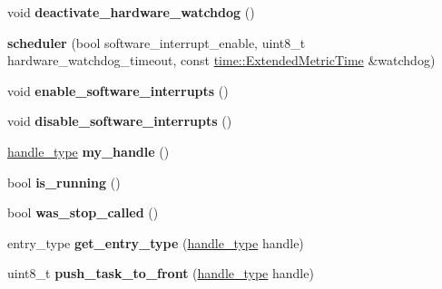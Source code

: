 \begin{DoxyCompactItemize}
void {\bfseries deactivate\+\_\+hardware\+\_\+watchdog} ()
\item 
\mbox{\label{classfsl_1_1os_1_1scheduler_a230f744ddd2b6b01986118750e7acb73}} 
{\bfseries scheduler} (bool software\+\_\+interrupt\+\_\+enable, uint8\+\_\+t hardware\+\_\+watchdog\+\_\+timeout, const \mbox{\hyperlink{classtime_1_1_extended_metric_time}{time\+::\+Extended\+Metric\+Time}} \&watchdog)
\item 
\mbox{\label{classfsl_1_1os_1_1scheduler_ac44463fc1db8cfb16afc064d6041afad}} 
void {\bfseries enable\+\_\+software\+\_\+interrupts} ()
\item 
\mbox{\label{classfsl_1_1os_1_1scheduler_a455e45cb1fa920318027bc1798c6844e}} 
void {\bfseries disable\+\_\+software\+\_\+interrupts} ()
\item 
\mbox{\label{classfsl_1_1os_1_1scheduler_abb221f5b722d445ebad8284b0052ec57}} 
\mbox{\hyperlink{classfsl_1_1lg_1_1range__int}{handle\+\_\+type}} {\bfseries my\+\_\+handle} ()
\item 
\mbox{\label{classfsl_1_1os_1_1scheduler_aaa41705e6a098ea595f137461b2d21e6}} 
bool {\bfseries is\+\_\+running} ()
\item 
\mbox{\label{classfsl_1_1os_1_1scheduler_a36b06ae2abf2dcee0abe1f406d0b66a7}} 
bool {\bfseries was\+\_\+stop\+\_\+called} ()
\item 
\mbox{\label{classfsl_1_1os_1_1scheduler_a9a1475961f3f822d639895e47700e741}} 
entry\+\_\+type {\bfseries get\+\_\+entry\+\_\+type} (\mbox{\hyperlink{classfsl_1_1lg_1_1range__int}{handle\+\_\+type}} handle)
\item 
\mbox{\label{classfsl_1_1os_1_1scheduler_adee2512ce3d45e23a218b82085390c5c}} 
uint8\+\_\+t {\bfseries push\+\_\+task\+\_\+to\+\_\+front} (\mbox{\hyperlink{classfsl_1_1lg_1_1range__int}{handle\+\_\+type}} handle)
\item 
\mbox{\label{classfsl_1_1os_1_1scheduler_a00edbdd6849b0944eca8606252c52571}} 

\end{DoxyCompactItemize}
